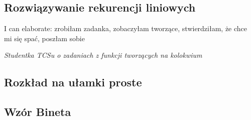 \subsection{Rozwiązywanie rekurencji liniowych}
\epigraph{I can elaborate: zrobiłam zadanka, zobaczyłam tworzące, stwierdziłam, że chce mi się spać, poszłam sobie}{\textit{Studentka TCSu o zadaniach z funkcji tworzących na kolokwium}}


\subsection{Rozkład na ułamki proste}


\subsection{Wzór Bineta}
